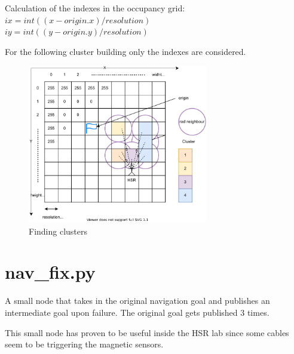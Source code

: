 \documentclass[main.tex]{subfiles}
\begin{document}
		Calculation of the indexes in the occupancy grid:\\
		$ix = int((x - origin.x) / resolution)$\\
		$iy = int((y - origin.y) / resolution)$
		
		For the following cluster building only the indexes are considered.
		
		\begin{figure}[H]
			\centering
			\includegraphics[width=0.7\textwidth]{pictures/obstacle_finder/Cluster-building2.pdf}
			\caption{Finding clusters}
			\label{img_building_cluster}
		\end{figure}
		
		\section{nav\_fix.py}
		A small node that takes in the original navigation goal and publishes an intermediate goal upon failure. The original goal gets published 3 times.
		
		This small node has proven to be useful inside the HSR lab since some cables seem to be triggering the magnetic sensors.

	\endgroup
\end{document}
